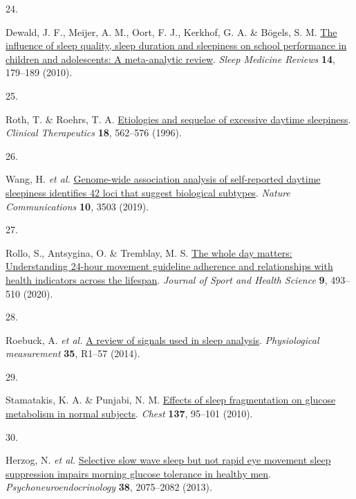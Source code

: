 \documentclass[
  10pt,
]{scrbook}
\newlength{\cslhangindent}
\newlength{\csllabelwidth}
\newlength{\cslentryspacingunit} %
\newenvironment{CSLReferences}[2] %
 {%
  \setlength{\parindent}{0pt}
  \ifodd #1
  \let\oldpar\par
  \def\par{\hangindent=\cslhangindent\oldpar}
  \fi
  \setlength{\parskip}{#2\cslentryspacingunit}
 }%
 {}
\newcommand{\CSLLeftMargin}[1]{\parbox[t]{\csllabelwidth}{#1}}
\newcommand{\CSLRightInline}[1]{\parbox[t]{\linewidth - \csllabelwidth}{#1}\break}
\let\originaltextbf\textbf
\renewcommand{\textbf}[1]{\textcolor{color1}{\textsf{\originaltextbf{#1}}}}
\begin{document}
\begin{CSLReferences}{0}{0}
\leavevmode{}%
\CSLLeftMargin{24. }%
\CSLRightInline{Dewald, J. F., Meijer, A. M., Oort, F. J., Kerkhof, G.
A. \& Bögels, S. M.
\href{https://doi.org/10.1016/j.smrv.2009.10.004}{The influence of sleep
quality, sleep duration and sleepiness on school performance in children
and adolescents: A meta-analytic review}. \emph{Sleep Medicine Reviews}
\textbf{14}, 179--189 (2010).}

\leavevmode{}%
\CSLLeftMargin{25. }%
\CSLRightInline{Roth, T. \& Roehrs, T. A.
\href{https://doi.org/10.1016/S0149-2918(96)80207-4}{Etiologies and
sequelae of excessive daytime sleepiness}. \emph{Clinical Therapeutics}
\textbf{18}, 562--576 (1996).}

\leavevmode{}%
\CSLLeftMargin{26. }%
\CSLRightInline{Wang, H. \emph{et al.}
\href{https://doi.org/10.1038/s41467-019-11456-7}{Genome-wide
association analysis of self-reported daytime sleepiness identifies 42
loci that suggest biological subtypes}. \emph{Nature Communications}
\textbf{10}, 3503 (2019).}

\leavevmode{}%
\CSLLeftMargin{27. }%
\CSLRightInline{Rollo, S., Antsygina, O. \& Tremblay, M. S.
\href{https://doi.org/10.1016/j.jshs.2020.07.004}{The whole day matters:
Understanding 24-hour movement guideline adherence and relationships
with health indicators across the lifespan}. \emph{Journal of Sport and
Health Science} \textbf{9}, 493--510 (2020).}

\leavevmode{}%
\CSLLeftMargin{28. }%
\CSLRightInline{Roebuck, A. \emph{et al.}
\href{https://doi.org/10.1088/0967-3334/35/1/R1}{A review of signals
used in sleep analysis}. \emph{Physiological measurement} \textbf{35},
R1--57 (2014).}

\leavevmode{}%
\CSLLeftMargin{29. }%
\CSLRightInline{Stamatakis, K. A. \& Punjabi, N. M.
\href{https://doi.org/10.1378/chest.09-0791}{Effects of sleep
fragmentation on glucose metabolism in normal subjects}. \emph{Chest}
\textbf{137}, 95--101 (2010).}

\leavevmode{}%
\CSLLeftMargin{30. }%
\CSLRightInline{Herzog, N. \emph{et al.}
\href{https://doi.org/10.1016/j.psyneuen.2013.03.018}{Selective slow
wave sleep but not rapid eye movement sleep suppression impairs morning
glucose tolerance in healthy men}. \emph{Psychoneuroendocrinology}
\textbf{38}, 2075--2082 (2013).}


\end{CSLReferences}
\end{document}
